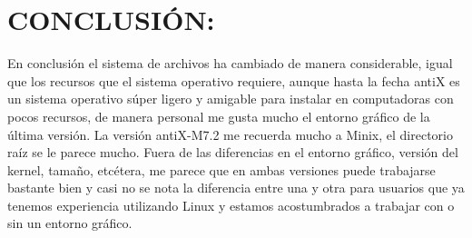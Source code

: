 \documentclass[a4paper, 11pt, oneside]{article}
\begin{document}
\section*{CONCLUSIÓN:}
En conclusión el sistema de archivos ha cambiado de manera considerable, igual que los recursos que el sistema operativo requiere, aunque hasta la fecha antiX es un sistema operativo súper ligero y amigable para instalar en computadoras con pocos recursos, de manera personal me gusta mucho el entorno gráfico de la última versión. La versión antiX-M7.2 me recuerda mucho a Minix, el directorio raíz se le parece mucho. Fuera de las diferencias en el entorno gráfico, versión del kernel, tamaño, etcétera, me parece que en ambas versiones puede trabajarse bastante bien y casi no se nota la diferencia entre una y otra para usuarios que ya tenemos experiencia utilizando Linux y estamos acostumbrados a trabajar con o sin un entorno gráfico.
\end{document}
